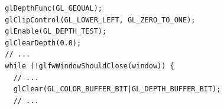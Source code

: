 \documentclass[calcdimensions,landscape,letterpaper]{powersem}
\newcommand{\thecurrentheading}{}
\newcommand{\heading}[1]{\renewcommand{\thecurrentheading}{#1}}
\begin{document}
\begin{slide}
    \heading{Rotated Quad}
    \begin{center}
    \end{center}
\end{slide}

\begin{slide}
    \heading{Enable Depth Testing}
    \begin{center}
        \begin{minipage}[c]{.8\textwidth}
            \begin{verbatim}
  glDepthFunc(GL_GEQUAL);
  glClipControl(GL_LOWER_LEFT, GL_ZERO_TO_ONE);
  glEnable(GL_DEPTH_TEST);
  glClearDepth(0.0);
  // ...
  while (!glfwWindowShouldClose(window)) {
    // ...
    glClear(GL_COLOR_BUFFER_BIT|GL_DEPTH_BUFFER_BIT);
    // ...
            \end{verbatim}
        \end{minipage}
    \end{center}
\end{slide}
\end{document}

